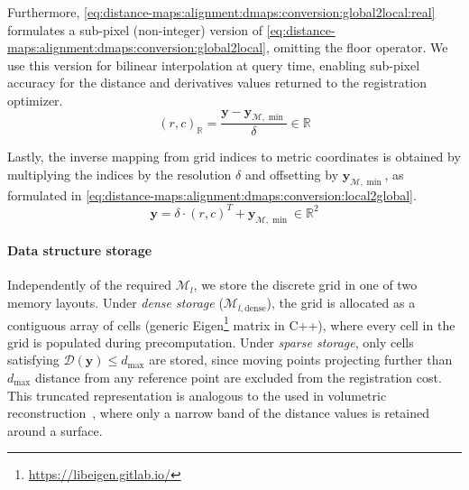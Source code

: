 Furthermore,
\eqref{eq:distance-maps:alignment:dmaps:conversion:global2local:real}
formulates a sub-pixel (non-integer) version of
\eqref{eq:distance-maps:alignment:dmaps:conversion:global2local}, omitting
the floor operator. We use this version for bilinear interpolation at
query time, enabling sub-pixel accuracy for the distance and derivatives
values returned to the registration optimizer.
\begin{equation}
\label{eq:distance-maps:alignment:dmaps:conversion:global2local:real}
(r, c)_{\mathbb{R}} =
\frac{\mathbf{y} - \mathbf{y}_{\mathcal{M},\min}}{\delta}
\in \mathbb{R}
\end{equation}

Lastly, the inverse mapping from grid indices to metric coordinates is obtained
by multiplying the indices by the resolution $\delta$ and offsetting by
$\mathbf{y}_{\mathcal{M},\min}$, as formulated in
\eqref{eq:distance-maps:alignment:dmaps:conversion:local2global}.
\begin{equation}
\label{eq:distance-maps:alignment:dmaps:conversion:local2global}
\mathbf{y} = \delta \cdot (r, c)^T + \mathbf{y}_{\mathcal{M},\min} \in \mathbb{R}^2
\end{equation}

\paragraph{Data structure storage}
Independently of the required
$\mathcal{M}_l$, we store the discrete grid in one of two memory layouts.
Under \emph{dense storage} ($\mathcal{M}_{l,\mathrm{dense}}$), the grid is
allocated as a contiguous array of cells (generic
Eigen\footnote{\label{note:eigen}\url{https://libeigen.gitlab.io/}} matrix in
C++), where every cell in the grid is populated during precomputation.
Under \emph{sparse storage}, only cells satisfying
$\mathcal{D}(\mathbf{y})\leq d_{\max}$ are stored, since moving points
projecting further than $d_{\max}$ distance from any reference point
are excluded from the registration cost. This truncated representation is
analogous to the  used in volumetric
reconstruction~\cite{curless-levoy:siggraph:1996},
where only a narrow band of the distance values is retained around a surface.

